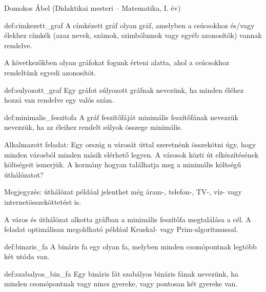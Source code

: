 \begin{description}
	{\large \item [{Szerző:}] Domokos Ábel (Didaktikai mesteri -- Matematika, I.
		év)}
\end{description}

\begin{definition}{def:cimkezett_graf} A címkézett gráf olyan gráf, amelyben a csúcsokhoz
	és/vagy élekhez címkék (azaz nevek, számok, szimbólumok vagy egyéb
	azonosítók) vannak rendelve.\par A következőkben olyan gráfokat fogunk
	érteni alatta, ahol a csúcsokhoz rendeltünk egyedi azonosítót. 
\end{definition}

\begin{definition}{def:sulyozott_graf} Egy gráfot súlyozott gráfnak nevezünk, ha minden
	éléhez hozzá van rendelve egy valós szám. 
\end{definition}

\begin{definition}{def:minimalis_feszitofa} A gráf feszítőfáját minimális feszítőfának
	nevezzük nevezzük, ha az éleihez rendelt súlyok összege minimális. 
\end{definition}

\begin{problem}
	Alkalmazott feladat: Egy ország n városát úttal szeretnénk összekötni
	úgy, hogy minden városból minden másik elérhető legyen. A városok
	közti út elkészítésének költségeit ismerjük. A kormány hogyan találhatja
	meg a minimális költségű úthálózatot?
\end{problem}

Megjegyzés: úthálózat például jelenthet még áram-, telefon-, TV-,
víz- vagy internetösszeköttetést is.
\begin{solution}
	A város és úthálózat alkotta gráfban a minimális feszítőfa megtalálása
	a cél. A feladat optimálisan megoldható például Kruskal- vagy Prim-algoritmussal. 
\end{solution}
\begin{definition}[Bináris fa]{def:binaris_fa} A bináris fa egy olyan fa, melyben minden csomópontnak
	legtöbb két utóda van. 
\end{definition}

\begin{definition}{def:szabalyos_bin_fa} Egy bináris fát szabályos bináris fának nevezünk,
	ha minden csomópontnak vagy nincs gyereke, vagy pontosan két gyereke
	van. 
\end{definition}

